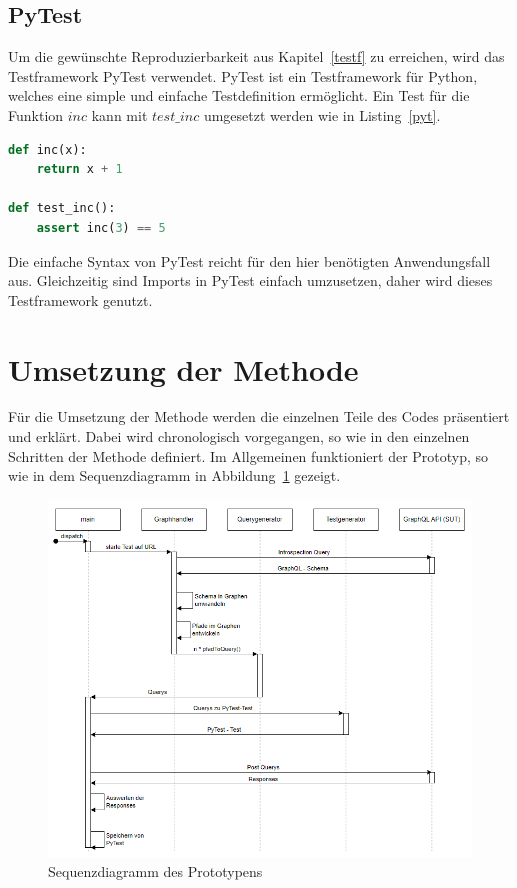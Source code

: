 \subsection{PyTest}

Um die gewünschte Reproduzierbarkeit aus Kapitel~\ref{testf} zu erreichen, wird das Testframework PyTest verwendet.
PyTest ist ein Testframework für Python, welches eine simple und einfache Testdefinition ermöglicht.
Ein Test für die Funktion $inc$ kann mit $test\_inc$ umgesetzt werden wie in Listing~\ref{pyt}.

\begin{lstlisting}[language=Python, caption={Unit mit Unit-Test}, label={pyt}]
def inc(x):
    return x + 1

def test_inc():
    assert inc(3) == 5
\end{lstlisting}

Die einfache Syntax von PyTest reicht für den hier benötigten Anwendungsfall aus.
Gleichzeitig sind Imports in PyTest einfach umzusetzen, daher wird dieses Testframework genutzt.
\newpage

\section{Umsetzung der Methode}

Für die Umsetzung der Methode werden die einzelnen Teile des Codes präsentiert und erklärt.
Dabei wird chronologisch vorgegangen, so wie in den einzelnen Schritten der Methode definiert.
Im Allgemeinen funktioniert der Prototyp, so wie in dem Sequenzdiagramm in Abbildung~\ref{sqzd} gezeigt.

\begin{figure}[H]
    \begin{center}
        \includegraphics[width=\textwidth,height=\textheight,keepaspectratio]{img/sequenz}
    \end{center}
    \caption{Sequenzdiagramm des Prototypens}
    \label{sqzd}
\end{figure}

